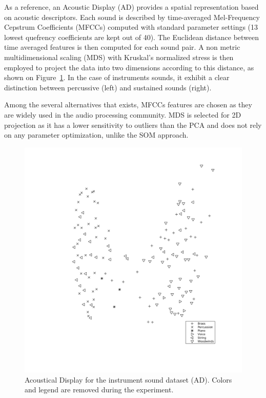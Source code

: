 \documentclass{aes2e}
\begin{document}
As a reference, an Acoustic Display (AD) provides a spatial representation based on acoustic descriptors. Each sound is described by time-averaged Mel-Frequency Cepstrum Coefficients (MFCCs) computed with standard parameter settings (13 lowest quefrency coefficients are kept out of 40). The Euclidean distance between time averaged features is then computed for each sound pair. A non metric multidimensional scaling (MDS) with Kruskal's normalized stress \cite{kruskal1964multidimensional} is then employed to project the data into two dimensions according to this distance, as shown on Figure~\ref{figXP3music}. In the case of instruments sounds, it exhibit a clear distinction between percussive (left) and sustained sounds (right).


Among the several alternatives that exists, MFCCs features are chosen as they are widely used in the audio processing community. MDS is selected for 2D projection as it has a lower sensitivity to outliers than the PCA and does not rely on any parameter optimization, unlike the SOM approach. 


\begin{figure}[t]
\begin{center}
\includegraphics[width=\columnwidth]{gfx/music_mds_bw.png} 
\end{center}
\caption{\label{figXP3music} Acoustical Display for the instrument sound dataset (AD). Colors and legend are removed during the experiment.}
\end{figure}
\end{document}
